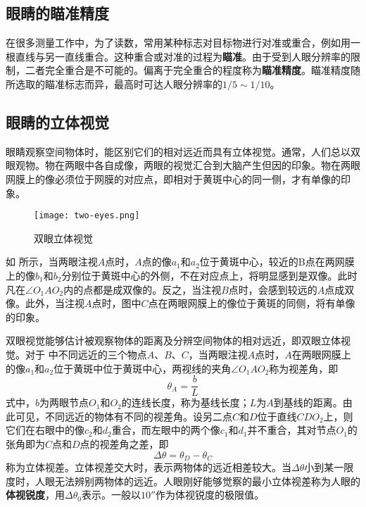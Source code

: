 \documentclass[cn,10pt,chinesefont=founder,math=newtx,cite=super,twoside]{elegantbook}
\begin{document}
\subsection{眼睛的瞄准精度}
在很多测量工作中，为了读数，常用某种标志对目标物进行对准或重合，例如用一根直线与另一直线重合。这种重合或对准的过程为\textbf{瞄准}。由于受到人眼分辨率的限制，二者完全重合是不可能的。偏离于完全重合的程度称为\textbf{瞄准精度}。瞄准精度随所选取的瞄准标志而异，最高时可达人眼分辨率的$1/5\sim1/10$。

\subsection{眼睛的立体视觉}
眼睛观察空间物体时，能区别它们的相对远近而具有立体视觉。通常，人们总以双眼观物。物在两眼中各自成像，两眼的视觉汇合到大脑产生但因的印象。物在两眼网膜上的像必须位于网膜的对应点，即相对于黄斑中心的同一侧，才有单像的印象。

\begin{figure}[htbp]
	\centering
	\texttt{[image: two-eyes.png]}
	\caption{双眼立体视觉}
	\label{fig:two-eyes}
\end{figure}

如 所示，当两眼注视$A$点时，$A$点的像$a_1$和$a_2$位于黄斑中心，较近的B点在两网膜上的像$b_1$和$b_2$分别位于黄斑中心的外侧，不在对应点上，将明显感到是双像。此时凡在$\angle O_1AO_2$内的点都是成双像的。反之，当注视$B$点时，会感到较远的$A$点成双像。此外，当注视$A$点时，图中$C$点在两眼网膜上的像位于黄斑的同侧，将有单像的印象。

双眼视觉能够估计被观察物体的距离及分辨空间物体的相对远近，即双眼立体视觉。对于 中不同远近的三个物点$A$、$B$、$C$，当两眼注视$A$点时，$A$在两眼网膜上的像$a_1$和$a_2$位于黄斑中位于黄斑中心，两视线的夹角$\angle O_1AO_2$称为视差角，即
\begin{equation}
\theta_A=\frac{b}{L}
\end{equation}
式中，$b$为两眼节点$O_1$和$O_2$的连线长度，称为基线长度；$L$为$A$到基线的距离。由此可见，不同远近的物体有不同的视差角。设另二点$C$和$D$位于直线$CDO_2$上，则它们在右眼中的像$c_2$和$d_2$重合，而左眼中的两个像$c_1$和$d_1$并不重合，其对节点$O_1$的张角即为$C$点和$D$点的视差角之差，即
\begin{equation}
\Delta\theta=\theta_D-\theta_C
\label{eq:parallax-angle-difference}
\end{equation}
称为立体视差。立体视差交大时，表示两物体的远近相差较大。当$\Delta\theta$小到某一限度时，人眼无法辨别两物体的远近。人眼刚好能够觉察的最小立体视差称为人眼的\textbf{体视锐度}，用$\Delta\theta_0$表示。一般以$10''$作为体视锐度的极限值。
\end{document}
